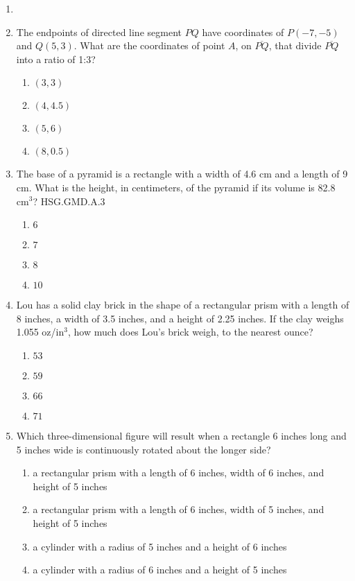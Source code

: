 \begin{enumerate}
\item \item The endpoints of directed line segment $PQ$ have coordinates of $P(-7,-5)$ and $Q(5,3)$. What are the coordinates of point $A$, on $\overline{PQ}$, that divide $\overline{PQ}$ into a ratio of 1:3?
\begin{multicols}{2}
  \begin{enumerate}
    \item $(3,3)$
    \item $(4,4.5)$
    \item $(5,6)$
    \item $(8,0.5)$
  \end{enumerate}
  \end{multicols} \vspace{2cm}

\item The base of a pyramid is a rectangle with a width of 4.6 cm and a length of 9 cm. What is the height, in centimeters, of the pyramid if its volume is 82.8 cm$^3$? \hfill HSG.GMD.A.3
\begin{multicols}{2}
  \begin{enumerate}
    \item $6$
    \item $7$
    \item $8$
    \item $10$
  \end{enumerate}
  \end{multicols} \vspace{0.5cm}

\item Lou has a solid clay brick in the shape of a rectangular prism with a length of 8 inches, a width of 3.5 inches, and a height of 2.25 inches. If the clay weighs 1.055 oz/in$^3$, how much does Lou's brick weigh, to the nearest ounce? 
\begin{multicols}{2}
  \begin{enumerate}
  \item $53$
  \item $59$
  \item $66$
  \item $71$
\end{enumerate}
\end{multicols} \vspace{2.5cm}

\newpage
\item Which three-dimensional figure will result when a rectangle 6 inches long and 5 inches wide is continuously rotated about the longer side?
\begin{enumerate}
  \item a rectangular prism with a length of 6 inches, width of 6 inches, and height of 5 inches
  \item a rectangular prism with a length of 6 inches, width of 5 inches, and height of 5 inches
  \item a cylinder with a radius of 5 inches and a height of 6 inches
  \item a cylinder with a radius of 6 inches and a height of 5 inches
\end{enumerate}


\end{enumerate}
